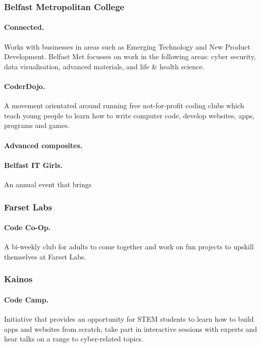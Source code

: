 \subsubsection{Belfast Metropolitan College}

\paragraph{Connected.} Works with businesses in areas such as Emerging Technology and New Product Development. Belfast Met focusses on work in the following areas: cyber security, data visualisation, advanced materials, and life \& health science.

\paragraph{CoderDojo.} A movement orientated around running free not-for-profit coding clubs which teach young people to learn how to write computer code, develop websites, apps, programs and games.

\paragraph{Advanced composites.} 

\paragraph{Belfast IT Girls.} An annual event that brings 

\subsubsection{Farset Labs}

\paragraph{Code Co-Op.} A bi-weekly club for adults to come together and work on fun projects to upskill themselves at Farset Labs.

\subsubsection{Kainos}

\paragraph{Code Camp.} Initiative that provides an opportunity for STEM students to learn how to build apps and websites from scratch, take part in interactive sessions with experts and hear talks on a range to cyber-related topics.


